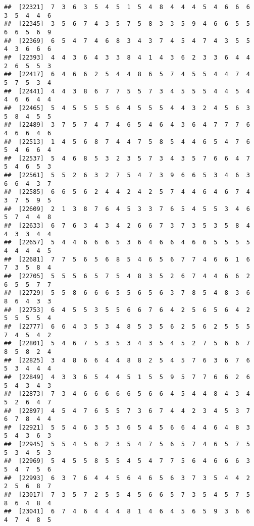 \documentclass[
]{book}
\begin{document}
\begin{verbatim}
##  [22321]  7  3  6  3  5  4  5  1  5  4  8  4  4  4  5  4  6  6  6  3  5  4  4  6
##  [22345]  3  5  6  7  4  3  5  7  5  8  3  3  5  9  4  6  6  5  5  6  6  5  6  9
##  [22369]  6  5  4  7  4  6  8  3  4  3  7  4  5  4  7  4  3  5  5  4  3  6  6  6
##  [22393]  4  4  3  6  4  3  3  8  4  1  4  3  6  2  3  3  6  4  4  2  6  5  5  3
##  [22417]  6  4  6  6  2  5  4  4  8  6  5  7  4  5  5  4  4  7  4  5  7  5  3  4
##  [22441]  4  4  3  8  6  7  7  5  5  7  3  4  5  5  5  4  4  5  4  4  6  6  4  4
##  [22465]  5  4  5  5  5  5  6  4  5  5  5  4  4  3  2  4  5  6  3  5  8  4  5  5
##  [22489]  3  7  5  7  4  7  4  6  5  4  6  4  3  6  4  7  7  7  6  4  6  6  4  6
##  [22513]  1  4  5  6  8  7  4  4  7  5  8  5  4  4  6  5  4  7  6  5  4  6  6  4
##  [22537]  5  4  6  8  5  3  2  3  5  7  3  4  3  5  7  6  6  4  7  5  4  6  5  3
##  [22561]  5  5  2  6  3  2  7  5  4  7  3  9  6  6  5  3  4  6  3  6  6  4  3  7
##  [22585]  6  6  5  6  2  4  4  2  4  2  5  7  4  4  6  4  6  7  4  3  7  5  9  5
##  [22609]  2  1  3  8  7  6  4  5  3  3  7  6  5  4  5  5  3  4  6  5  7  4  4  8
##  [22633]  6  7  6  3  4  3  4  2  6  6  7  3  7  3  5  3  5  8  4  4  3  3  4  4
##  [22657]  5  4  4  6  6  6  5  3  6  4  6  6  4  6  6  5  5  5  5  4  4  4  4  5
##  [22681]  7  7  5  6  5  6  8  5  4  6  5  6  7  7  4  6  6  1  6  7  3  5  8  4
##  [22705]  5  5  5  6  5  7  5  4  8  3  5  2  6  7  4  4  6  6  2  6  5  5  7  7
##  [22729]  5  5  8  6  6  6  5  5  6  5  6  3  7  8  5  4  8  3  6  8  6  4  3  3
##  [22753]  6  4  5  5  3  5  5  6  6  7  6  4  2  5  6  5  6  4  2  5  5  5  5  4
##  [22777]  6  6  4  3  5  3  4  8  5  3  5  6  2  5  6  2  5  5  5  7  4  5  4  2
##  [22801]  5  4  6  7  5  3  5  3  4  3  5  4  5  2  7  5  6  6  7  8  5  8  2  4
##  [22825]  3  4  8  6  6  4  4  8  8  2  5  4  5  7  6  3  6  7  6  5  3  4  4  4
##  [22849]  4  3  3  6  5  4  4  5  1  5  5  9  5  7  7  6  6  2  6  5  4  3  4  3
##  [22873]  7  3  4  6  6  6  6  6  5  6  6  4  5  4  4  8  4  3  4  5  2  6  4  7
##  [22897]  4  5  4  7  6  5  5  7  3  6  7  4  4  2  3  4  5  3  7  6  7  8  4  4
##  [22921]  5  5  4  6  3  5  3  6  5  4  5  6  6  4  4  6  4  8  3  5  4  3  6  3
##  [22945]  5  5  4  5  6  2  3  5  4  7  5  6  5  7  4  6  5  7  5  5  3  4  5  3
##  [22969]  5  4  5  5  8  5  5  4  5  4  7  7  5  6  4  6  6  6  3  5  4  7  5  6
##  [22993]  6  3  7  6  4  4  5  6  4  6  5  6  3  7  3  5  4  4  2  2  5  6  8  7
##  [23017]  7  3  5  7  2  5  5  4  5  6  6  5  7  3  5  4  5  7  5  8  6  4  8  4
##  [23041]  6  7  4  6  4  4  4  8  1  4  6  4  5  6  5  9  3  6  6  4  7  4  8  5

\end{verbatim}
\end{document}
